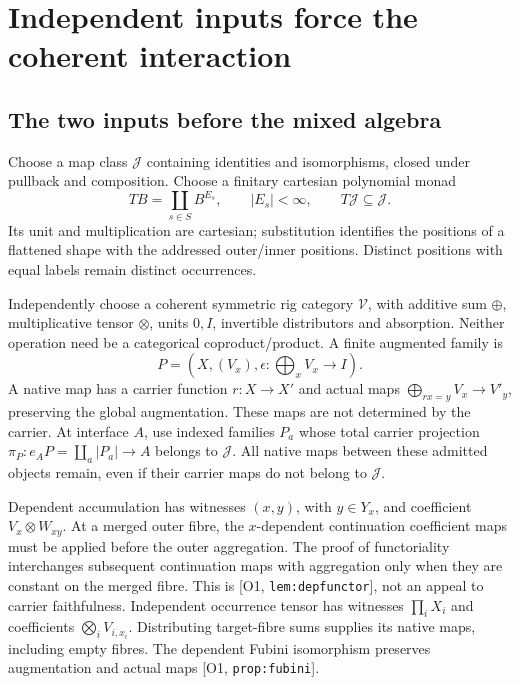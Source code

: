 \documentclass[11pt,a4paper]{article}
\theoremstyle{definition}
\newcommand{\J}{\mathcal J}
\newcommand{\V}{\mathcal V}
\newcommand{\Addr}[2]{\textup{[#1, \texttt{#2}]}}
\begin{document}
\section{Independent inputs force the coherent interaction}\label{sec:criterion}

\subsection{The two inputs before the mixed algebra}
Choose a map class \(\J\) containing identities and isomorphisms, closed
under pullback and composition. Choose a finitary cartesian polynomial monad
\[
 TB=\coprod_{s\in S}B^{E_s},\qquad |E_s|<\infty,\qquad T\J\subseteq\J.
\]
Its unit and multiplication are cartesian; substitution identifies the
positions of a flattened shape with the addressed outer/inner positions.
Distinct positions with equal labels remain distinct occurrences.

Independently choose a coherent symmetric rig category \(\V\), with
additive sum \(\oplus\), multiplicative tensor \(\otimes\), units
\(0,I\), invertible distributors and absorption. Neither operation need
be a categorical coproduct/product. A finite augmented family is
\[
 P=(X,(V_x),\epsilon:\bigoplus_xV_x\to I).
\]
A native map has a carrier function \(r:X\to X'\) and actual maps
\(\bigoplus_{rx=y}V_x\to V'_y\), preserving the global augmentation.
These maps are not determined by the carrier. At interface \(A\), use
indexed families \(P_a\) whose total carrier projection
\(\pi_P:e_AP=\coprod_a|P_a|\to A\) belongs to \(\J\).
All native maps between these admitted objects remain, even if their
carrier maps do not belong to \(\J\).

Dependent accumulation has witnesses \((x,y)\), with \(y\in Y_x\),
and coefficient \(V_x\otimes W_{xy}\). At a merged outer fibre, the
\(x\)-dependent continuation coefficient maps must be applied before
the outer aggregation. The proof of functoriality interchanges subsequent
continuation maps with aggregation only when they are constant on the
merged fibre. This is \Addr{O1}{lem:depfunctor}, not an appeal to carrier
faithfulness. Independent occurrence tensor has witnesses \(\prod_iX_i\)
and coefficients \(\bigotimes_iV_{i,x_i}\). Distributing target-fibre
sums supplies its native maps, including empty fibres. The dependent
Fubini isomorphism preserves augmentation and actual maps
\Addr{O1}{prop:fubini}.
\end{document}
